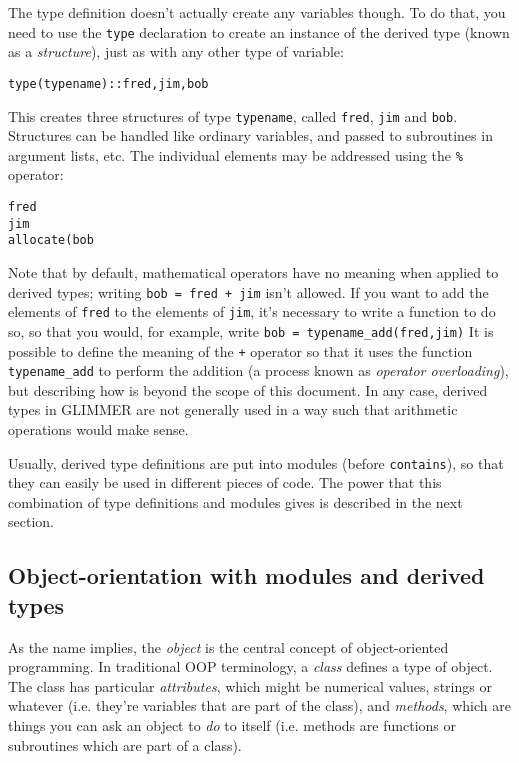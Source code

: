 The type definition doesn't actually create any variables though. To do that,
you need to use the \texttt{type} declaration to create an instance of the
derived type (known as a \emph{structure}), just as with any other type of
variable:
%
\begin{alltt}
    type(typename) :: fred, jim, bob
\end{alltt} 
%
This creates three structures of type \texttt{typename}, called \texttt{fred},
\texttt{jim} and \texttt{bob}. Structures can be handled like ordinary
variables, and passed to subroutines in argument lists, etc. The individual
elements may be addressed using the \texttt{\%} operator:
%
\begin{alltt}
    fred%realvar = 4.5
    jim%intvar = fred%intvar + 7
    allocate(bob%realarr(nx,ny))
\end{alltt}

Note that by default, mathematical operators have no meaning when applied to
derived types; writing \texttt{bob = fred + jim} isn't allowed. If you want to
add the elements of \texttt{fred} to the elements of \texttt{jim}, it's
necessary to write a function to do so, so that you would, for example, write
\texttt{bob = typename\_add(fred,jim)} It is possible to define the meaning of
the \texttt{+} operator so that it uses the function \texttt{typename\_add} to
perform the addition (a process known as \emph{operator overloading}), but
describing how is beyond the scope of this document. In any case, derived types
in GLIMMER are not generally used in a way such that arithmetic operations
would make sense.

Usually, derived type definitions are put into modules (before
\texttt{contains}), so that they can easily be used in different pieces of
code. The power that this combination of type definitions and modules gives is
described in the next section.
%
\subsection{Object-orientation with modules and derived types}

As the name implies, the \emph{object} is the central concept of
object-oriented programming. In traditional OOP terminology, a \emph{class}
defines a type of object. The class has particular \emph{attributes}, which
might be numerical values, strings or whatever (i.e. they're variables that
are part of the class), and \emph{methods}, which are things you can ask an
object to \emph{do} to itself (i.e. methods are functions or subroutines which
are part of a class).


